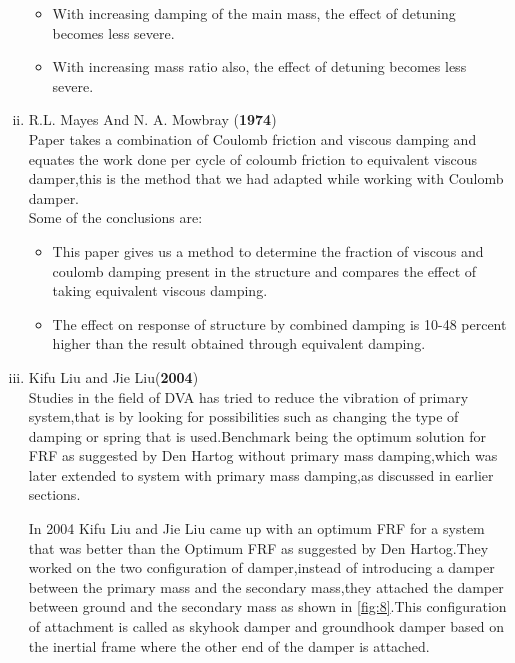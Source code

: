 \begin{enumerate}[i)]
\begin{itemize}
 \item With increasing damping of the main mass, the effect of detuning becomes less severe.

\item  With increasing mass ratio also, the effect of detuning becomes less severe.

\end{itemize}

\item {R.L. Mayes And N. A. Mowbray (\textbf{1974})}\\
Paper takes a combination of Coulomb friction and viscous damping and equates the work done per cycle of coloumb friction  to equivalent viscous damper,this is the method that we had adapted while working with Coulomb damper.\\
Some of the conclusions are:
\begin{itemize}
\item This paper gives us a method to determine the fraction of viscous and coulomb damping present in the structure and compares the effect of taking equivalent viscous damping.

\item The effect on response of structure by combined damping is 10-48 percent higher than the result obtained through equivalent damping.
\end{itemize}

\item {Kifu Liu and Jie Liu(\textbf{2004})}\\
Studies in the field of DVA has tried to reduce the vibration of primary system,that is by  looking for possibilities such as changing the type of damping or spring that is used.Benchmark being the optimum solution for FRF as suggested by Den Hartog without primary mass damping,which was later extended to system with primary mass damping,as discussed in earlier sections.

In 2004 Kifu Liu and Jie Liu came up with an optimum FRF for a system that was better than the Optimum FRF as suggested by Den Hartog.They worked on the two configuration of damper,instead of introducing a damper between the primary mass and the secondary mass,they attached the damper between ground and the secondary mass as shown in \ref{fig:8}.This configuration of attachment is called as skyhook damper and groundhook damper based on the inertial frame where the other end of the damper is attached.


\end{enumerate}
